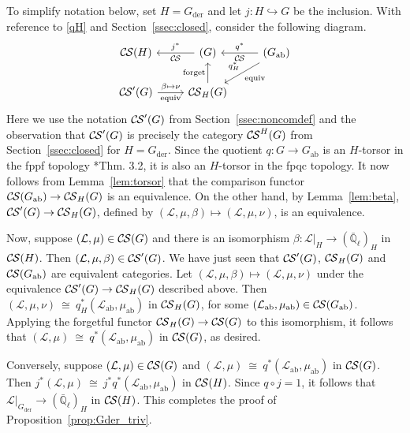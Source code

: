 \documentclass[10pt]{amsart}
\theoremstyle{plain}
\theoremstyle{definition}
\newcommand{\EE}{\mathbb{\bar Q}_\ell}
\newcommand{\der}{_{\operatorname{der}}}
\newcommand{\ab}{_{\operatorname{ab}}}
\newcommand{\iso}{{\ \cong\ }}
\newcommand{\cs}[1]{{\mathcal{#1}}}
\newcommand{\CS}{{\mathcal{C\hskip-0.8pt S}}}
\begin{document}
To simplify notation below, set $H=G\der$
and let $j : H\hookrightarrow G$ be the inclusion. 
With reference to \eqref{qH} and Section~\ref{ssec:closed}, consider the following diagram.
\[
\begin{tikzcd}
\CS(H) & \arrow{l}[swap]{j^*} \CS(G) &\arrow{l}[swap]{q^*} 
\CS(G\ab) \arrow{dl}{\text{equiv}}[swap]{q_{H}^*} \\
 \CS'(G)  \arrow{r}{\beta \mapsto \nu}[swap]{\text{equiv}} &  \CS_{H}(G) \arrow{u}{\text{forget}}  & 
\end{tikzcd}
\]
%
Here we use the notation $\CS'(G)$ from Section~\ref{ssec:noncomdef} and the observation that $\CS'(G)$ is precisely the category $\CS^{H}(G)$ from Section~\ref{ssec:closed} for $H=G\der$.
%
Since the quotient $q : G \to G\ab$ is an $H$-torsor in the fppf topology \cite{demazure:SGA3-VIA}*{Thm. 3.2}, 
it is also an $H$-torsor in the fpqc topology.
It now follows from Lemma~\ref{lem:torsor} that the comparison functor $\CS(G\ab)\to \CS_{H}(G)$ is an equivalence.
%
On the other hand, by Lemma~\ref{lem:beta}, $\CS'(G) \to \CS_{H}(G)$, defined by $(\cs{L},\mu,\beta)\mapsto (\cs{L},\mu, \nu)$, is an equivalence.

Now, suppose $(\cs{L},\mu)\in \CS(G)$ and there is an isomorphism $\beta : \cs{L}\vert_{H} \to (\EE)_{H}$ in $\CS(H)$.
Then $(\cs{L},\mu,\beta) \in \CS'(G)$.
We have just seen that $\CS'(G)$, $\CS_H(G)$ and $\CS(G\ab)$ are equivalent categories.
Let $(\cs{L},\mu,\beta) \mapsto (\cs{L},\mu,\nu)$ under the equivalence $\CS'(G) \to \CS_H(G)$ described above.
Then $(\cs{L},\mu,\nu) \iso q_H^*(\cs{L}\ab,\mu\ab)$ in $\CS_H(G)$, for some $(\cs{L}\ab,\mu\ab)\in \CS(G\ab)$.
Applying the forgetful functor $\CS_H(G)\to \CS(G)$ to this isomorphism, it follows that $(\cs{L},\mu) \iso q^*(\cs{L}\ab,\mu\ab)$ in $\CS(G)$, as desired. 

Conversely, suppose $(\cs{L},\mu)\in \CS(G)$ and $(\cs{L},\mu) \iso q^*(\cs{L}\ab,\mu\ab)$ in $\CS(G)$.
Then $j^*(\cs{L},\mu) \iso j^*q^*(\cs{L}\ab,\mu\ab)$ in $\CS(H)$. 
Since $q\circ j = 1$, it follows that $\cs{L}\vert_{G\der} \to (\EE)_{H}$ in $\CS(H)$.
This completes the proof of Proposition~\ref{prop:Gder_triv}.
\end{document}
